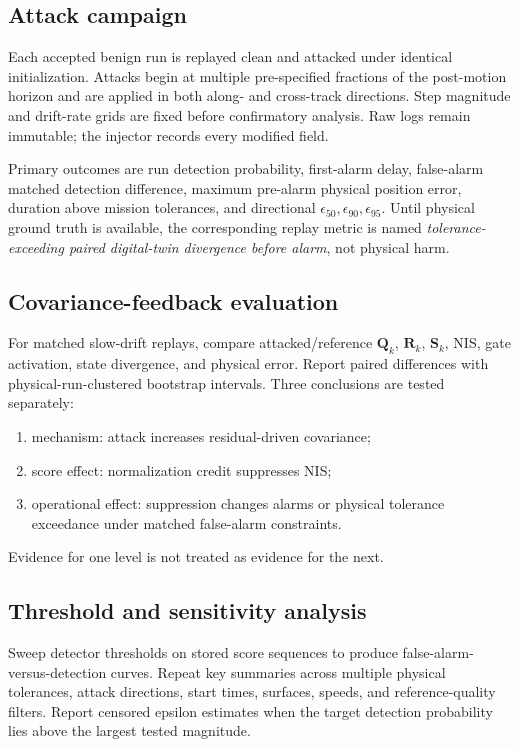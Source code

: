 \documentclass[11pt,a4paper]{article}
\begin{document}
\subsection{Attack campaign}

Each accepted benign run is replayed clean and attacked under identical
initialization. Attacks begin at multiple pre-specified fractions of the
post-motion horizon and are applied in both along- and cross-track directions.
Step magnitude and drift-rate grids are fixed before confirmatory analysis.
Raw logs remain immutable; the injector records every modified field.

Primary outcomes are run detection probability, first-alarm delay, false-alarm
matched detection difference, maximum pre-alarm physical position error,
duration above mission tolerances, and directional
$\epsilon_{50},\epsilon_{90},\epsilon_{95}$. Until physical ground truth is
available, the corresponding replay metric is named
\emph{tolerance-exceeding paired digital-twin divergence before alarm}, not
physical harm.

\subsection{Covariance-feedback evaluation}

For matched slow-drift replays, compare attacked/reference $\mathbf Q_k$,
$\mathbf R_k$, $\mathbf S_k$, NIS, gate activation, state divergence, and
physical error. Report paired differences with physical-run-clustered
bootstrap intervals. Three conclusions are tested separately:
\begin{enumerate}
  \item mechanism: attack increases residual-driven covariance;
  \item score effect: normalization credit suppresses NIS;
  \item operational effect: suppression changes alarms or physical tolerance
  exceedance under matched false-alarm constraints.
\end{enumerate}
Evidence for one level is not treated as evidence for the next.

\subsection{Threshold and sensitivity analysis}

Sweep detector thresholds on stored score sequences to produce
false-alarm-versus-detection curves. Repeat key summaries across multiple
physical tolerances, attack directions, start times, surfaces, speeds, and
reference-quality filters. Report censored epsilon estimates when the target
detection probability lies above the largest tested magnitude.
\end{document}
